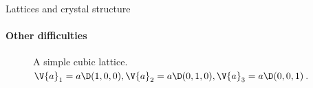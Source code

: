 \documentclass{beamer}
\begin{document}
\begin{frame}{Lattices and crystal structure}
\framesubtitle{Other difficulties}
\begin{figure}[H]
	\centering
	\caption{A simple cubic lattice. $ \V{a}_1 = a\D (1,0,0), \V{a}_2 = a\D(0,1,0), \V{a}_3 = a\D (0,0,1) $.}
	\label{fig:cubic_no_grid}
\end{figure}
\end{frame}
\end{document}
